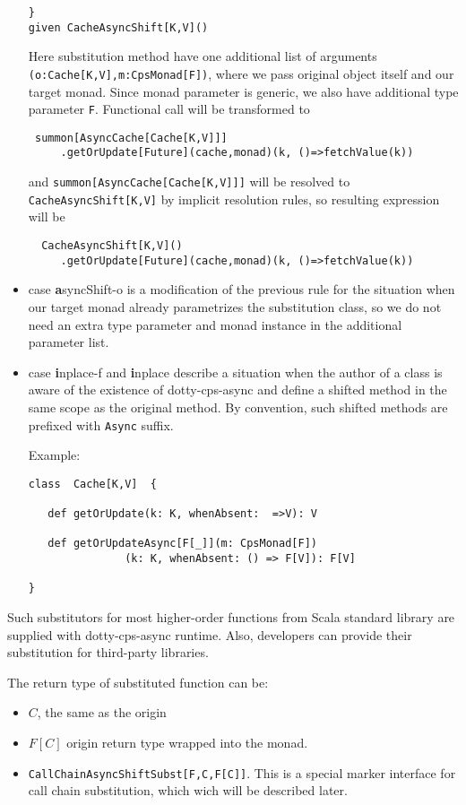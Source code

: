 \documentclass{llncs}
\begin{document}
\begin{itemize}
\begin{lstlisting}
}
given CacheAsyncShift[K,V]()
\end{lstlisting}   
  Here substitution method have one additional list of arguments \\ \lstinline|(o:Cache[K,V],m:CpsMonad[F])|, where we pass original object itself and our target monad. Since monad parameter is generic, we also have additional type parameter \lstinline|F|.
  Functional call will be transformed to
\begin{lstlisting}
 summon[AsyncCache[Cache[K,V]]]
     .getOrUpdate[Future](cache,monad)(k, ()=>fetchValue(k))
\end{lstlisting}   
   and \lstinline|summon[AsyncCache[Cache[K,V]]]| will be resolved to \lstinline|CacheAsyncShift[K,V]| by implicit resolution rules, so resulting expression will be
\begin{lstlisting}
  CacheAsyncShift[K,V]()
     .getOrUpdate[Future](cache,monad)(k, ()=>fetchValue(k))
\end{lstlisting}   
   \item case {\textbf asyncShift-o} is a modification of the previous rule for the situation when our target monad already parametrizes the substitution class, so we do not need an extra type parameter and monad instance in the additional parameter list.
    \item case {\textbf inplace-f } and {\textbf inplace }  
    describe a situation when the author of a class is aware of the existence of dotty-cps-async and define a shifted
    method in the same scope as the original method.  By convention, such shifted methods are prefixed with \lstinline|Async| suffix.  
    
    Example:  
\begin{lstlisting}
class  Cache[K,V]  {

   def getOrUpdate(k: K, whenAbsent:  =>V): V

   def getOrUpdateAsync[F[_]](m: CpsMonad[F])
               (k: K, whenAbsent: () => F[V]): F[V]

}
\end{lstlisting}   
       
   
 \end{itemize}
 
   Such substitutors for most higher-order functions from Scala standard library are supplied with dotty-cps-async runtime. Also, developers can provide their substitution for third-party libraries.

  The return type of substituted function can be:
  \begin{itemize}
    \item $C$, the same as the origin
    \item $F[C]$  origin return type wrapped into the monad. 
    \item \lstinline|CallChainAsyncShiftSubst[F,C,F[C]]|. This is a special marker interface for call chain substitution, which wich will be described later.
  \end{itemize}
\end{document}
